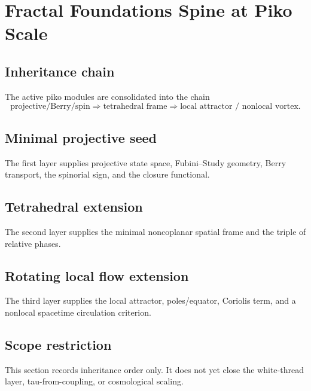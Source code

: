 \section{Fractal Foundations Spine at Piko Scale}
\label{sec:fractal-foundations-spine}

\subsection{Inheritance chain}
The active piko modules are consolidated into the chain
\begin{equation}
\text{projective/Berry/spin}
\Rightarrow
\text{tetrahedral frame}
\Rightarrow
\text{local attractor / nonlocal vortex}.
\end{equation}

\subsection{Minimal projective seed}
The first layer supplies projective state space, Fubini--Study geometry, Berry transport, the spinorial sign, and the closure functional.

\subsection{Tetrahedral extension}
The second layer supplies the minimal noncoplanar spatial frame and the triple of relative phases.

\subsection{Rotating local flow extension}
The third layer supplies the local attractor, poles/equator, Coriolis term, and a nonlocal spacetime circulation criterion.

\subsection{Scope restriction}
This section records inheritance order only. It does not yet close the white-thread layer, tau-from-coupling, or cosmological scaling.
